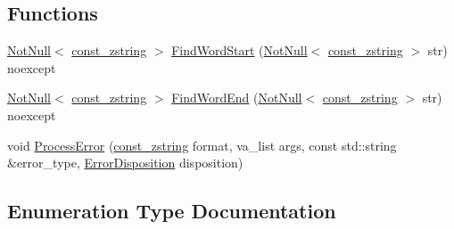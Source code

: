 \subsection*{Functions}
\begin{DoxyCompactItemize}
\item 
\mbox{\hyperlink{namespacemage_a8769f9d670d6b585ea306cb1062af94b}{Not\+Null}}$<$ \mbox{\hyperlink{namespacemage_abfd9206dc607ceb5d13ec68bf075a5c0}{const\+\_\+zstring}} $>$ \mbox{\hyperlink{namespacemage_1_1anonymous__namespace_02error_8cpp_03_ac2c9c8d3c3af36b6b785b48fb81cd22b}{Find\+Word\+Start}} (\mbox{\hyperlink{namespacemage_a8769f9d670d6b585ea306cb1062af94b}{Not\+Null}}$<$ \mbox{\hyperlink{namespacemage_abfd9206dc607ceb5d13ec68bf075a5c0}{const\+\_\+zstring}} $>$ str) noexcept
\item 
\mbox{\hyperlink{namespacemage_a8769f9d670d6b585ea306cb1062af94b}{Not\+Null}}$<$ \mbox{\hyperlink{namespacemage_abfd9206dc607ceb5d13ec68bf075a5c0}{const\+\_\+zstring}} $>$ \mbox{\hyperlink{namespacemage_1_1anonymous__namespace_02error_8cpp_03_abcee849d53ddc420623108f831c88b0c}{Find\+Word\+End}} (\mbox{\hyperlink{namespacemage_a8769f9d670d6b585ea306cb1062af94b}{Not\+Null}}$<$ \mbox{\hyperlink{namespacemage_abfd9206dc607ceb5d13ec68bf075a5c0}{const\+\_\+zstring}} $>$ str) noexcept
\item 
void \mbox{\hyperlink{namespacemage_1_1anonymous__namespace_02error_8cpp_03_a62bc179e83b7317ab0331cebdc43f980}{Process\+Error}} (\mbox{\hyperlink{namespacemage_abfd9206dc607ceb5d13ec68bf075a5c0}{const\+\_\+zstring}} format, va\+\_\+list args, const std\+::string \&error\+\_\+type, \mbox{\hyperlink{namespacemage_1_1anonymous__namespace_02error_8cpp_03_a02d701a32d4f84856df21925fcce5500}{Error\+Disposition}} disposition)
\end{DoxyCompactItemize}


\subsection{Enumeration Type Documentation}
\mbox{\label{namespacemage_1_1anonymous__namespace_02error_8cpp_03_a02d701a32d4f84856df21925fcce5500}} 
